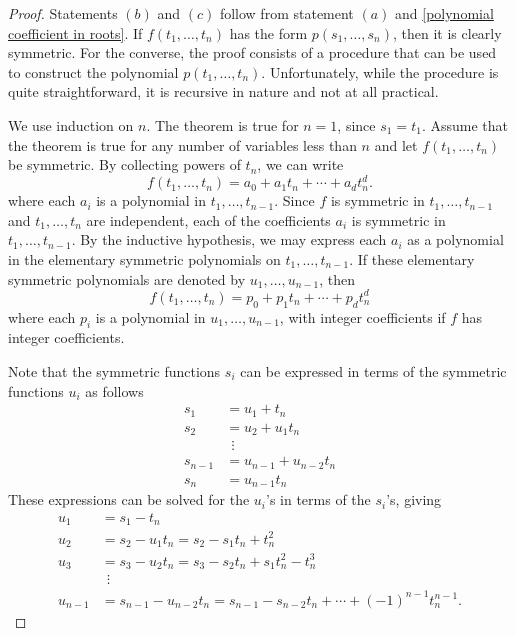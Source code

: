 \begin{proof}
Statements $(b)$ and $(c)$ follow from statement $(a)$ and \cref{polynomial coefficient in roots}. If $f(t_1,\dots,t_n)$ has the form $p(s_1,\dots,s_n)$, then it is clearly symmetric. For the converse, the proof consists of a procedure that can be used to construct the polynomial $p(t_1,\dots,t_n)$. Unfortunately, while the procedure is quite straightforward, it is recursive in nature and not at all practical.\par
We use induction on $n$. The theorem is true for $n=1$, since $s_1=t_1$. Assume that the theorem is true for any number of variables less than $n$ and let $f(t_1,\dots,t_n)$ be symmetric. By collecting powers of $t_n$, we can write
\[f(t_1,\dots,t_n)=a_0+a_1t_n+\cdots+a_dt_n^d.\]
where each $a_i$ is a polynomial in $t_1,\dots,t_{n-1}$. Since $f$ is symmetric in $t_1,\dots,t_{n-1}$ and $t_1,\dots,t_{n}$ are independent, each of the coefficients $a_i$ is symmetric in $t_1,\dots,t_{n-1}$. By the inductive hypothesis, we may express each $a_i$ as a polynomial in the elementary symmetric polynomials on $t_1,\dots,t_{n-1}$. If these elementary symmetric polynomials are denoted by $u_1,\dots,u_{n-1}$, then
\[f(t_1,\dots,t_n)=p_0+p_1t_n+\cdots+p_dt_n^d\]
where each $p_i$ is a polynomial in $u_1,\dots,u_{n-1}$, with integer coefficients if $f$ has integer coefficients.\par
Note that the symmetric functions $s_i$ can be expressed in terms of the symmetric functions $u_i$ as follows
\begin{equation}\label{Newton's Theorem-1}
\begin{aligned}
s_1&=u_1+t_n\\
s_2&=u_2+u_1t_n\\
&\ \ \vdots\\
s_{n-1}&=u_{n-1}+u_{n-2}t_n\\
s_n&=u_{n-1}t_n
\end{aligned}
\end{equation}
These expressions can be solved for the $u_i$'s in terms of the $s_i$'s, giving
\begin{equation}\label{Newton's Theorem-2}
\begin{aligned}
u_1&=s_1-t_n\\
u_2&=s_2-u_1t_n=s_2-s_1t_n+t_n^2\\
u_3&=s_3-u_2t_n=s_3-s_2t_n+s_1t_n^2-t_n^3\\
&\ \ \vdots\\
u_{n-1}&=s_{n-1}-u_{n-2}t_n=s_{n-1}-s_{n-2}t_n+\cdots+(-1)^{n-1}t_n^{n-1}.

\end{aligned}
\end{equation}
\end{proof}
